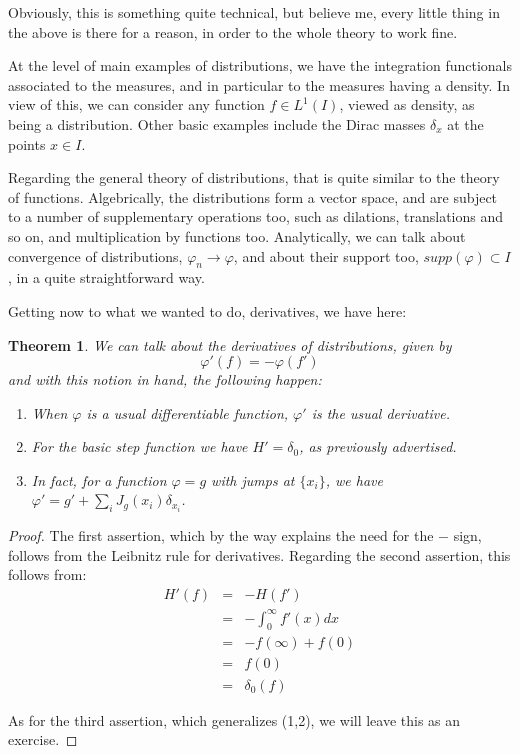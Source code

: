 \documentclass[12pt]{amsbook}
\newtheorem{theorem}{Theorem}[chapter]
\begin{document}
Obviously, this is something quite technical, but believe me, every little thing in the above is there for a reason, in order to the whole theory to work fine.

\bigskip

At the level of main examples of distributions, we have the integration functionals associated to the measures, and in particular to the measures having a density. In view of this, we can consider any function $f\in L^1(I)$, viewed as density, as being a distribution. Other basic examples include the Dirac masses $\delta_x$ at the points $x\in I$. 

\bigskip

Regarding the general theory of distributions, that is quite similar to the theory of functions. Algebrically, the distributions form a vector space, and are subject to a number of supplementary operations too, such as dilations, translations and so on, and multiplication by functions too. Analytically, we can talk about convergence of distributions, $\varphi_n\to\varphi$, and about their support too, $supp(\varphi)\subset I$, in a quite straightforward way.

\bigskip

Getting now to what we wanted to do, derivatives, we have here:

\begin{theorem}
We can talk about the derivatives of distributions, given by
$$\varphi'(f)=-\varphi(f')$$
and with this notion in hand, the following happen:
\begin{enumerate}
\item When $\varphi$ is a usual differentiable function, $\varphi'$ is the usual derivative.

\item For the basic step function we have $H'=\delta_0$, as previously advertised.

\item In fact, for a function $\varphi=g$ with jumps at $\{x_i\}$, we have $\varphi'=g'+\sum_iJ_g(x_i)\delta_{x_i}$.
\end{enumerate}
\end{theorem}

\begin{proof}
The first assertion, which by the way explains the need for the $-$ sign, follows from the Leibnitz rule for derivatives. Regarding the second assertion, this follows from:
\begin{eqnarray*}
H'(f)
&=&-H(f')\\
&=&-\int_0^\infty f'(x)dx\\
&=&-f(\infty)+f(0)\\
&=&f(0)\\
&=&\delta_0(f)
\end{eqnarray*}

As for the third assertion, which generalizes (1,2), we will leave this as an exercise.
\end{proof}
\end{document}
